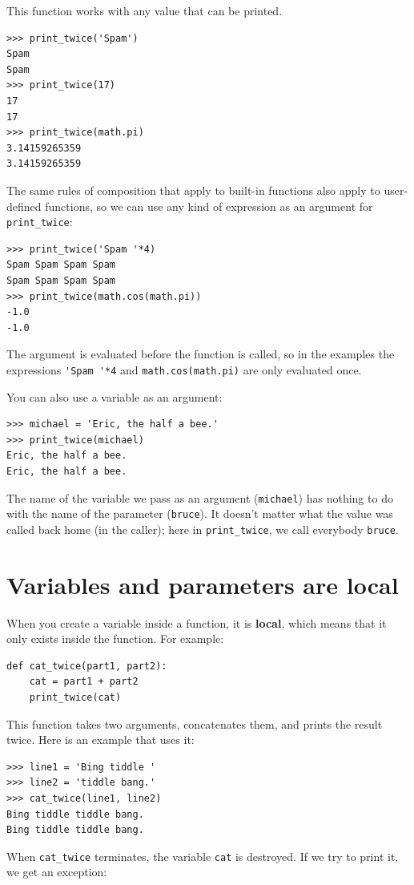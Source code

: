 \documentclass[10pt]{book}
\begin{document}
This function works with any value that can be printed.

\begin{verbatim}
>>> print_twice('Spam')
Spam
Spam
>>> print_twice(17)
17
17
>>> print_twice(math.pi)
3.14159265359
3.14159265359
\end{verbatim}
%
The same rules of composition that apply to built-in functions also
apply to user-defined functions, so we can use any kind of expression
as an argument for \verb"print_twice":

\begin{verbatim}
>>> print_twice('Spam '*4)
Spam Spam Spam Spam
Spam Spam Spam Spam
>>> print_twice(math.cos(math.pi))
-1.0
-1.0
\end{verbatim}
%
The argument is evaluated before the function is called, so
in the examples the expressions \verb"'Spam '*4" and
{\tt math.cos(math.pi)} are only evaluated once.

You can also use a variable as an argument:

\begin{verbatim}
>>> michael = 'Eric, the half a bee.'
>>> print_twice(michael)
Eric, the half a bee.
Eric, the half a bee.
\end{verbatim}
%
The name of the variable we pass as an argument ({\tt michael}) has
nothing to do with the name of the parameter ({\tt bruce}).  It
doesn't matter what the value was called back home (in the caller);
here in \verb"print_twice", we call everybody {\tt bruce}.


\section{Variables and parameters are local}

When you create a variable inside a function, it is {\bf local},
which means that it only
exists inside the function.  For example:

\begin{verbatim}
def cat_twice(part1, part2):
    cat = part1 + part2
    print_twice(cat)
\end{verbatim}
%
This function takes two arguments, concatenates them, and prints
the result twice.  Here is an example that uses it:

\begin{verbatim}
>>> line1 = 'Bing tiddle '
>>> line2 = 'tiddle bang.'
>>> cat_twice(line1, line2)
Bing tiddle tiddle bang.
Bing tiddle tiddle bang.
\end{verbatim}
%
When \verb"cat_twice" terminates, the variable {\tt cat}
is destroyed.  If we try to print it, we get an exception:
\end{document}
